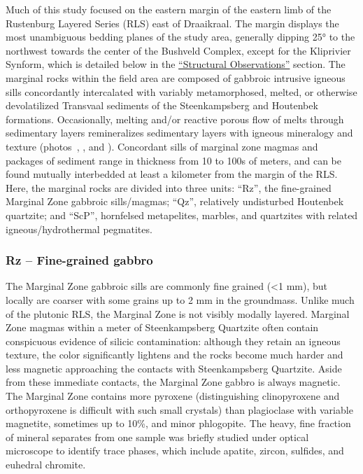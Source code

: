 Much of this study focused on the eastern margin of the eastern limb of
the Rustenburg Layered Series (RLS) east of Draaikraal. The margin
displays the most unambiguous bedding planes of the study area,
generally dipping 25° to the northwest towards the center of the
Bushveld Complex, except for the Kliprivier Synform, which is detailed
below in the \hyperref[sec:ch5-structural-observations]{``Structural Observations''} section. The marginal rocks
within the field area are composed of gabbroic intrusive igneous sills
concordantly intercalated with variably metamorphosed, melted, or
otherwise devolatilized Transvaal sediments of the Steenkampsberg and
Houtenbek formations. Occasionally, melting and/or reactive porous flow
of melts through sedimentary layers remineralizes sedimentary layers
with igneous mineralogy and texture (photos~, , and ). Concordant
sills of marginal zone magmas and packages of sediment range in
thickness from 10 to 100s of meters, and can be found mutually
interbedded at least a kilometer from the margin of the RLS. Here, the
marginal rocks are divided into three units: ``Rz'', the fine-grained
Marginal Zone gabbroic sills/magmas; ``Qz'', relatively undisturbed
Houtenbek quartzite; and ``ScP'', hornfelsed metapelites, marbles, and
quartzites with related igneous/hydrothermal pegmatites.

\subsubsection{Rz -- Fine-grained gabbro}
\label{sec:ch5-unit-rz}

The Marginal Zone gabbroic sills are commonly fine grained (\textless1
mm), but locally are coarser with some grains up to 2 mm in the
groundmass. Unlike much of the plutonic RLS, the Marginal Zone is not
visibly modally layered. Marginal Zone magmas within a meter of
Steenkampsberg Quartzite often contain conspicuous evidence of silicic
contamination: although they retain an igneous texture, the color
significantly lightens and the rocks become much harder and less
magnetic approaching the contacts with Steenkampsberg Quartzite. Aside
from these immediate contacts, the Marginal Zone gabbro is always
magnetic. The Marginal Zone contains more pyroxene (distinguishing
clinopyroxene and orthopyroxene is difficult with such small crystals)
than plagioclase with variable magnetite, sometimes up to 10\%, and
minor phlogopite. The heavy, fine fraction of mineral separates from one
sample was briefly studied under optical microscope to identify trace
phases, which include apatite, zircon, sulfides, and euhedral chromite.

